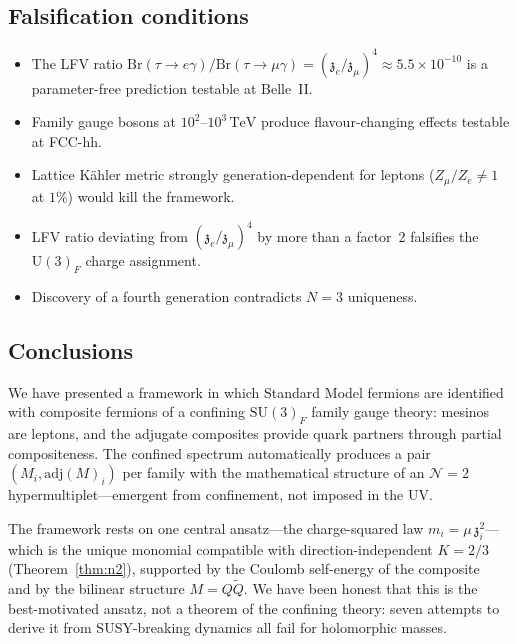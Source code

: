 \documentclass[aps,prd,twocolumn,showpacs,preprintnumbers,superscriptaddress,floatfix]{revtex4-2}
\newcommand{\SU}{\mathrm{SU}}
\newcommand{\UU}{\mathrm{U}}
\newcommand{\adj}{\mathrm{adj}}
\newcommand{\TeV}{\,\mathrm{TeV}}
\newcommand{\zch}{\mathfrak{z}}
\begin{document}
\subsection{Falsification conditions}

\begin{itemize}
  \item The LFV ratio
    $\mathrm{Br}(\tau \to e\gamma)/\mathrm{Br}(\tau \to \mu\gamma)
    = (\zch_e/\zch_\mu)^4 \approx 5.5 \times 10^{-10}$ is a
    parameter-free prediction testable at Belle~II.
  \item Family gauge bosons at $10^2$--$10^3\TeV$ produce
    flavour-changing effects testable at FCC-hh.
  \item Lattice K\"ahler metric strongly generation-dependent
    for leptons ($Z_\mu/Z_e \neq 1$ at $1\%$) would kill the
    framework.
  \item LFV ratio deviating from $(\zch_e/\zch_\mu)^4$ by more
    than a factor~2 falsifies the $\UU(3)_F$ charge assignment.
  \item Discovery of a fourth generation contradicts $N = 3$
    uniqueness.
\end{itemize}

\subsection{Conclusions}

We have presented a framework in which Standard Model fermions
are identified with composite fermions of a confining $\SU(3)_F$
family gauge theory: mesinos are leptons, and the adjugate
composites provide quark partners through partial compositeness.
The confined spectrum automatically produces a pair
$(M_i, \adj(M)_i)$ per family with the mathematical structure of
an $\mathcal{N}{=}2$ hypermultiplet---emergent from confinement,
not imposed in the UV.

The framework rests on one central ansatz---the charge-squared
law $m_i = \mu\,\zch_i^2$---which is the unique monomial
compatible with direction-independent $K = 2/3$
(Theorem~\ref{thm:n2}), supported by the Coulomb self-energy
of the composite~\cite{Koide:1983qe} and by the bilinear
structure $M = Q\tilde{Q}$.
We have been honest that this is the best-motivated ansatz, not
a theorem of the confining theory: seven attempts to derive it
from SUSY-breaking dynamics all fail for holomorphic masses.
\end{document}

